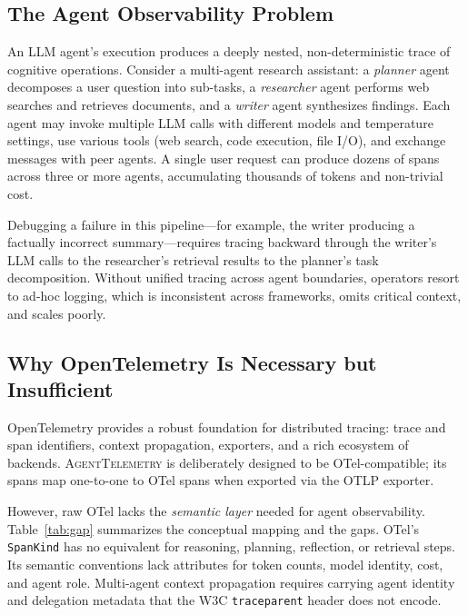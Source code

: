 \documentclass[sigconf,nonacm]{acmart}
\begin{document}
\subsection{The Agent Observability Problem}
An LLM agent's execution produces a deeply nested, non-deterministic trace
of cognitive operations.  Consider a multi-agent research assistant: a
\emph{planner} agent decomposes a user question into sub-tasks, a
\emph{researcher} agent performs web searches and retrieves documents, and
a \emph{writer} agent synthesizes findings.  Each agent may invoke
multiple LLM calls with different models and temperature settings, use
various tools (web search, code execution, file I/O), and exchange messages
with peer agents.  A single user request can produce dozens of spans
across three or more agents, accumulating thousands of tokens and
non-trivial cost.

Debugging a failure in this pipeline---for example, the writer
producing a factually incorrect summary---requires tracing backward
through the writer's LLM calls to the researcher's retrieval results to
the planner's task decomposition.  Without unified tracing across agent
boundaries, operators resort to ad-hoc logging, which is inconsistent
across frameworks, omits critical context, and scales poorly.

\subsection{Why OpenTelemetry Is Necessary but Insufficient}
OpenTelemetry provides a robust foundation for distributed tracing: trace
and span identifiers, context propagation, exporters, and a rich
ecosystem of backends.  \textsc{AgentTelemetry} is deliberately designed
to be OTel-compatible; its spans map one-to-one to OTel spans when
exported via the OTLP exporter.

However, raw OTel lacks the \emph{semantic layer} needed for agent
observability.  Table~\ref{tab:gap} summarizes the conceptual mapping
and the gaps.  OTel's \texttt{SpanKind} has no equivalent for reasoning,
planning, reflection, or retrieval steps.  Its semantic conventions lack
attributes for token counts, model identity, cost, and agent role.
Multi-agent context propagation requires carrying agent identity and
delegation metadata that the W3C \texttt{traceparent} header does not encode.
\end{document}
